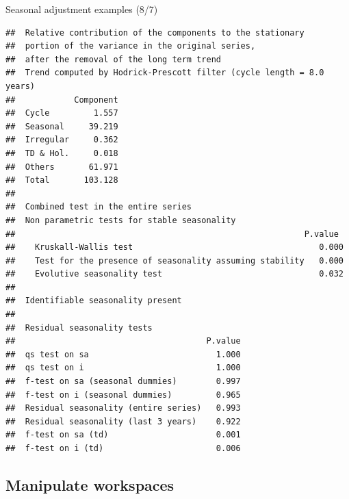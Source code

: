 \documentclass[10pt,xcolor=table,color={dvipsnames,usenames},ignorenonframetext,usepdftitle=false,french]{beamer}
\newenvironment{Shaded}{\begin{snugshade}}{\end{snugshade}}
\newcommand{\NormalTok}[1]{#1}
\newcommand{\OperatorTok}[1]{\textcolor[rgb]{0.81,0.36,0.00}{\textbf{#1}}}
\begin{document}
\begin{frame}[fragile]{Seasonal adjustment examples (8/7)}
\protect\hypertarget{seasonal-adjustment-examples-87}{}

\footnotesize

\begin{Shaded}
\end{Shaded}

\begin{verbatim}
##  Relative contribution of the components to the stationary
##  portion of the variance in the original series,
##  after the removal of the long term trend 
##  Trend computed by Hodrick-Prescott filter (cycle length = 8.0 years)
##            Component
##  Cycle         1.557
##  Seasonal     39.219
##  Irregular     0.362
##  TD & Hol.     0.018
##  Others       61.971
##  Total       103.128
## 
##  Combined test in the entire series 
##  Non parametric tests for stable seasonality
##                                                           P.value
##    Kruskall-Wallis test                                      0.000
##    Test for the presence of seasonality assuming stability   0.000
##    Evolutive seasonality test                                0.032
##  
##  Identifiable seasonality present
## 
##  Residual seasonality tests 
##                                       P.value
##  qs test on sa                          1.000
##  qs test on i                           1.000
##  f-test on sa (seasonal dummies)        0.997
##  f-test on i (seasonal dummies)         0.965
##  Residual seasonality (entire series)   0.993
##  Residual seasonality (last 3 years)    0.922
##  f-test on sa (td)                      0.001
##  f-test on i (td)                       0.006
\end{verbatim}

\end{frame}

\hypertarget{manipulate-workspaces}{%
\subsection{Manipulate workspaces}\label{manipulate-workspaces}}
\end{document}
